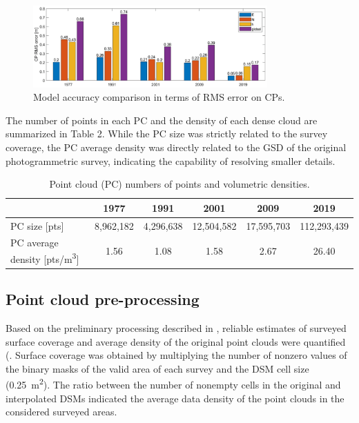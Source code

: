 {\begin{figure}
    \centering
    \includegraphics[width=0.8\textwidth]{cp_error.png}
    \caption{Model accuracy comparison in terms of RMS error on CPs. }
    \label{fig:2:cp_error}
\end{figure}

The number of points in each PC and the density of each dense cloud are summarized in Table 2.
While the PC size was strictly related to the survey coverage, the PC average density was directly related to the GSD of the original photogrammetric survey, indicating the capability of resolving smaller details.

\begin{table}
    \centering
    \caption{Point cloud (PC) numbers of points and volumetric densities.}
    \label{tab:2:pcd_density}
    \begin{tabular}{lccccc}
        \hline
        & 1977 & 1991 & 2001 & 2009 & 2019 \\
        \hline
        PC size [pts] & 8,962,182 & 4,296,638 & 12,504,582 & 17,595,703 & 112,293,439 \\
        PC average density [pts/m\textsuperscript{3}] & 1.56 & 1.08 & 1.58 & 2.67 & 26.40 \\
        \hline
    \end{tabular}
\end{table}


\subsection{Point cloud pre-processing}\label{sec:2:res_preproc}

Based on the preliminary processing described in , reliable estimates of surveyed surface coverage and average density of the original point clouds were quantified (.
Surface coverage was obtained by multiplying the number of nonzero values of the binary masks of the valid area of each survey and the DSM cell size (\SI{0.25}{\square\meter}). 
The ratio between the number of nonempty cells in the original and interpolated DSMs indicated the average data density of the point clouds in the considered surveyed areas. 

}
